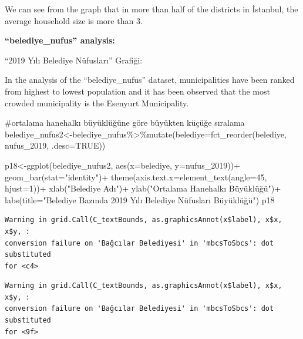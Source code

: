 \documentclass[
  11pt,
  a4paper,
  DIV=11,
  numbers=noendperiod]{scrartcl}
\newenvironment{Shaded}{\begin{snugshade}}{\end{snugshade}}
\newcommand{\AttributeTok}[1]{\textcolor[rgb]{0.40,0.45,0.13}{#1}}
\newcommand{\CommentTok}[1]{\textcolor[rgb]{0.37,0.37,0.37}{#1}}
\newcommand{\ConstantTok}[1]{\textcolor[rgb]{0.56,0.35,0.01}{#1}}
\newcommand{\DecValTok}[1]{\textcolor[rgb]{0.68,0.00,0.00}{#1}}
\newcommand{\FunctionTok}[1]{\textcolor[rgb]{0.28,0.35,0.67}{#1}}
\newcommand{\NormalTok}[1]{\textcolor[rgb]{0.00,0.23,0.31}{#1}}
\newcommand{\OtherTok}[1]{\textcolor[rgb]{0.00,0.23,0.31}{#1}}
\newcommand{\SpecialCharTok}[1]{\textcolor[rgb]{0.37,0.37,0.37}{#1}}
\newcommand{\StringTok}[1]{\textcolor[rgb]{0.13,0.47,0.30}{#1}}
\begin{document}
We can see from the graph that in more than half of the districts in
İstanbul, the average household size is more than 3.

\textbf{``belediye\_nufus'' analysis:}

``2019 Yılı Belediye Nüfusları'' Grafiği:

In the analysis of the ``belediye\_nufus'' dataset, municipalities have
been ranked from highest to lowest population and it has been observed
that the most crowded municipality is the Esenyurt Municipality.

\begin{Shaded}
\begin{Highlighting}[]
\CommentTok{\#ortalama hanehalkı büyüklüğüne göre büyükten küçüğe sıralama}
\NormalTok{belediye\_nufus2}\OtherTok{\textless{}{-}}\NormalTok{belediye\_nufus}\SpecialCharTok{\%\textgreater{}\%}\FunctionTok{mutate}\NormalTok{(}\AttributeTok{belediye=}\FunctionTok{fct\_reorder}\NormalTok{(belediye, nufus\_2019, }\AttributeTok{.desc=}\ConstantTok{TRUE}\NormalTok{))}

\NormalTok{p18}\OtherTok{\textless{}{-}}\FunctionTok{ggplot}\NormalTok{(belediye\_nufus2, }\FunctionTok{aes}\NormalTok{(}\AttributeTok{x=}\NormalTok{belediye, }\AttributeTok{y=}\NormalTok{nufus\_2019))}\SpecialCharTok{+}
  \FunctionTok{geom\_bar}\NormalTok{(}\AttributeTok{stat=}\StringTok{"identity"}\NormalTok{)}\SpecialCharTok{+}
  \FunctionTok{theme}\NormalTok{(}\AttributeTok{axis.text.x=}\FunctionTok{element\_text}\NormalTok{(}\AttributeTok{angle=}\DecValTok{45}\NormalTok{, }\AttributeTok{hjust=}\DecValTok{1}\NormalTok{))}\SpecialCharTok{+}
  \FunctionTok{xlab}\NormalTok{(}\StringTok{"Belediye Adı"}\NormalTok{)}\SpecialCharTok{+}
  \FunctionTok{ylab}\NormalTok{(}\StringTok{"Ortalama Hanehalkı Büyüklüğü"}\NormalTok{)}\SpecialCharTok{+}
  \FunctionTok{labs}\NormalTok{(}\AttributeTok{title=}\StringTok{"Belediye Bazında 2019 Yılı Belediye Nüfusları Büyüklüğü"}\NormalTok{)}
\NormalTok{p18}
\end{Highlighting}
\end{Shaded}

\begin{verbatim}
Warning in grid.Call(C_textBounds, as.graphicsAnnot(x$label), x$x, x$y, :
conversion failure on 'Bağcılar Belediyesi' in 'mbcsToSbcs': dot substituted
for <c4>
\end{verbatim}

\begin{verbatim}
Warning in grid.Call(C_textBounds, as.graphicsAnnot(x$label), x$x, x$y, :
conversion failure on 'Bağcılar Belediyesi' in 'mbcsToSbcs': dot substituted
for <9f>
\end{verbatim}
\end{document}
